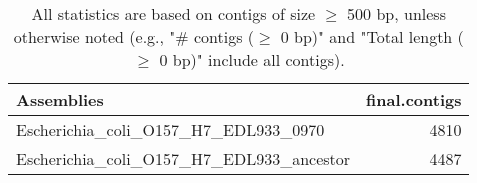 \documentclass[12pt,a4paper]{article}
\begin{document}
\begin{table}[ht]
\begin{center}
\caption{All statistics are based on contigs of size $\geq$ 500 bp, unless otherwise noted (e.g., "\# contigs ($\geq$ 0 bp)" and "Total length ($\geq$ 0 bp)" include all contigs).}
\begin{tabular}{|l*{1}{|r}|}
\hline
Assemblies & final.contigs \\ \hline
Escherichia\_coli\_O157\_H7\_EDL933\_0970 & 4810 \\ \hline
Escherichia\_coli\_O157\_H7\_EDL933\_ancestor & 4487 \\ \hline
\end{tabular}
\end{center}
\end{table}
\end{document}
